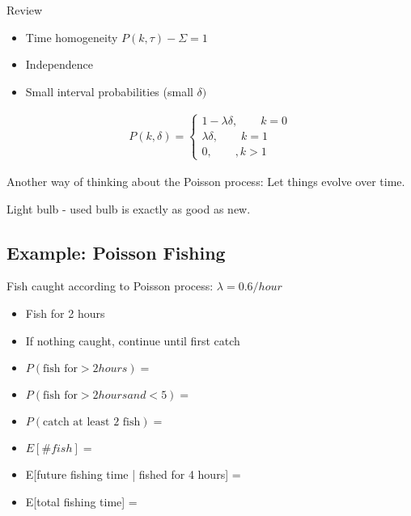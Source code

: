 

Review 
\begin{itemize}
    \item Time homogeneity $P(k, \tau) - \Sigma = 1$
    \item Independence
    \item Small interval probabilities  (small $\delta)$
\end{itemize}

\begin{align*}
P(k,\delta)=
\begin{cases}
    1 - \lambda \delta, \qquad k=0\\
    \lambda \delta, \qquad k=1\\
    0, \qquad, k>1
\end{cases}    
\end{align*}

  Another way of thinking about the Poisson process: Let things evolve over time.

Light bulb - used bulb is exactly as good as new.

\subsection{Example: Poisson Fishing}


Fish caught according to Poisson process: $\lambda=0.6/hour$

\begin{itemize}
    \item Fish for 2 hours
    \item If nothing caught, continue until first catch
\end{itemize}

\begin{itemize}
    \item $P(\text{fish for} > 2hours) = $
    \item $P(\text{fish for} > 2hours and < 5) = $
    \item $P(\text{catch at least 2 fish}) = $
    \item $E[\# fish]=$
    \item E[future fishing time | fished for 4 hours] =
    \item E[total fishing time] = 
\end{itemize}

